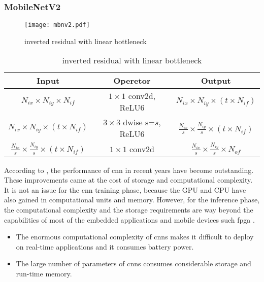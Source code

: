\subsubsection{MobileNetV2} \label{subs:mbv2}
%
\begin{figure}
    \centering
    \texttt{[image: mbnv2.pdf]}
    \caption{inverted residual with linear bottleneck \cite{sandler_mobilenetv2_2018}}
    \label{fig:invreslinbot}
\end{figure}
\begin{table}
    \center
    \begin{tabular}{c|c|c}
        Input & Operetor & Output \\
        \hline \hline
        $N_{ix} \times N_{iy} \times N_{if}$ & $1 \times 1$ conv2d, ReLU6 & $N_{ix} \times N_{iy} \times (t \times N_{if})$ \\
        $N_{ix} \times N_{iy} \times (t \times N_{if})$ & $3 \times3$ dwise s=$s$, ReLU6 & $\frac{N_{ix}}{s} \times \frac{N_{iy}}{s} \times (t \times N_{if})$ \\
        $\frac{N_{ix}}{s} \times \frac{N_{iy}}{s} \times (t \times N_{if})$ & $1 \times 1$ conv2d & $\frac{N_{ix}}{s} \times \frac{N_{iy}}{s} \times N_{of}$ \\
        \hline \hline
    \end{tabular}
    \caption{inverted residual with linear bottleneck \cite{sandler_mobilenetv2_2018}}
    \label{tab:invreslinbot}
\end{table}
%
According to \textcite{cheng_recent_2018}, the performance of \acrshort{cnn} in recent years have become outstanding. These improvements came at the cost of storage and computational complexity. It is not an issue for the \acrshort{cnn} training phase, because the GPU and CPU have also gained in computational units and memory. However, for the inference phase, the computational complexity and the storage requirements are way beyond the capabilities of most of the embedded applications and mobile devices such \acrshort{fpga} \cite{cheng_recent_2018}.
%
\begin{itemize}
    \item The enormous computational complexity of \acrshort{cnn}s makes it difficult to deploy on real-time applications and it consumes battery power.
    \item The large number of parameters of \acrshort{cnn}s consumes considerable storage and run-time memory.
\end{itemize}

